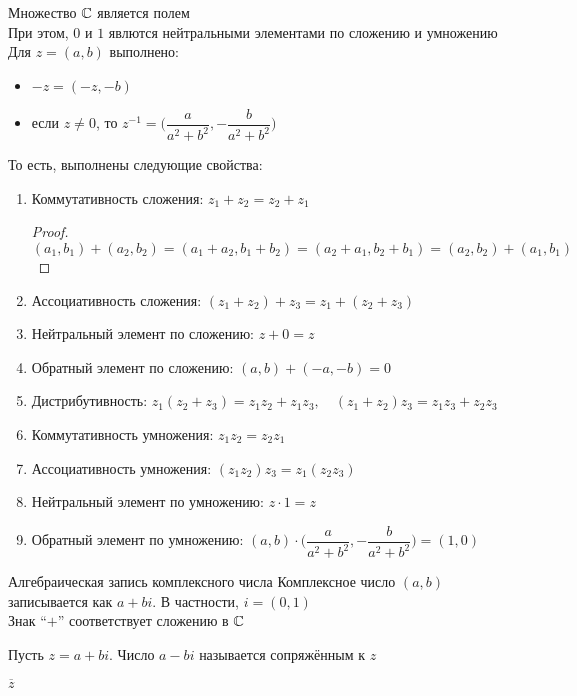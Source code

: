 \begin{theorem}
	Множество $\mathbb{C}$ является полем \\
	При этом, $0$ и $1$ явлются нейтральными элементами по сложению и умножению \\
	Для $z = (a, b)$ выполнено:
	\begin{itemize}
		\item $-z = (-z, -b)$
		\item если $z \ne 0$, то $z^{-1} = \bigg( \dfrac{a}{a^2 + b^2}, -\dfrac{b}{a^2 + b^2} \bigg) $
	\end{itemize}
	То есть, выполнены следующие свойства:
	\begin{enumerate}
		\item Коммутативность сложения: $z_1 + z_2 = z_2 + z_1 $
		\begin{proof}
			$ (a_1, b_1) + (a_2, b_2) = (a_1 + a_2, b_1 + b_2) = (a_2 + a_1, b_2 + b_1) = (a_2, b_2) + (a_1, b_1) $
		\end{proof}
		\item Ассоциативность сложения: $ (z_1 + z_2) + z_3 = z_1 + (z_2 + z_3) $
		\item Нейтральный элемент по сложению: $z + 0 = z$
		\item Обратный элемент по сложению: $(a, b) + (-a, -b) = 0$
		\item Дистрибутивность: $z_1(z_2 + z_3) = z_1z_2 + z_1z_3, \quad (z_1 + z_2)z_3 = z_1z_3 + z_2z_3 $
		\item Коммутативность умножения: $z_1z_2 = z_2z_1 $
		\item Ассоциативность умножения: $(z_1z_2)z_3 = z_1(z_2z_3) $
		\item Нейтральный элемент по умножению: $z \cdot 1 = z$
		\item Обратный элемент по умножению: $(a, b) \cdot \bigg( \dfrac{a}{a^2 + b^2}, -\dfrac{b}{a^2 + b^2} \bigg) = (1, 0) $
	\end{enumerate}
\end{theorem}

\begin{undefthm}{Алгебраическая запись комплексного числа}
	Комплексное число $(a, b)$ записывается как $a + bi$. В частности, $i = (0, 1)$ \\
	Знак ``$+$'' соответствует сложению в $\mathbb{C}$
\end{undefthm}

\begin{definition}
	Пусть $z = a + bi$. Число $a - bi$ называется сопряжённым к $z$
	\begin{notation}
		$\overline{z}$
	\end{notation}
\end{definition}

